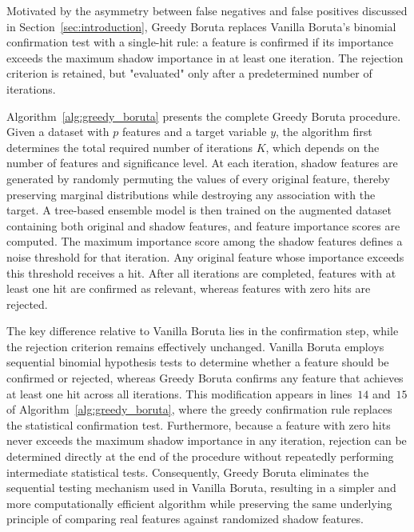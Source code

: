 \documentclass[runningheads]{llncs}
\begin{document}
Motivated by the asymmetry between false negatives and false positives discussed in Section~\ref{sec:introduction}, Greedy Boruta replaces Vanilla Boruta's binomial confirmation test with a single-hit rule: a feature is confirmed if its importance exceeds the maximum shadow importance in at least one iteration. The rejection criterion is retained, but "evaluated" only after a predetermined number of iterations.

Algorithm~\ref{alg:greedy_boruta} presents the complete Greedy Boruta procedure. Given a dataset with $p$ features and a target variable $y$, the algorithm first determines the total required number of iterations $K$, which depends on the number of features and significance level. At each iteration, shadow features are generated by randomly permuting the values of every original feature, thereby preserving marginal distributions while destroying any association with the target. A tree-based ensemble model is then trained on the augmented dataset containing both original and shadow features, and feature importance scores are computed. The maximum importance score among the shadow features defines a noise threshold for that iteration. Any original feature whose importance exceeds this threshold receives a hit. After all iterations are completed, features with at least one hit are confirmed as relevant, whereas features with zero hits are rejected.

The key difference relative to Vanilla Boruta lies in the confirmation step, while the rejection criterion remains effectively unchanged. Vanilla Boruta employs sequential binomial hypothesis tests to determine whether a feature should be confirmed or rejected, whereas Greedy Boruta confirms any feature that achieves at least one hit across all iterations. This modification appears in lines~$14$ and~$15$ of Algorithm~\ref{alg:greedy_boruta}, where the greedy confirmation rule replaces the statistical confirmation test. Furthermore, because a feature with zero hits never exceeds the maximum shadow importance in any iteration, rejection can be determined directly at the end of the procedure without repeatedly performing intermediate statistical tests. Consequently, Greedy Boruta eliminates the sequential testing mechanism used in Vanilla Boruta, resulting in a simpler and more computationally efficient algorithm while preserving the same underlying principle of comparing real features against randomized shadow features.
\end{document}
